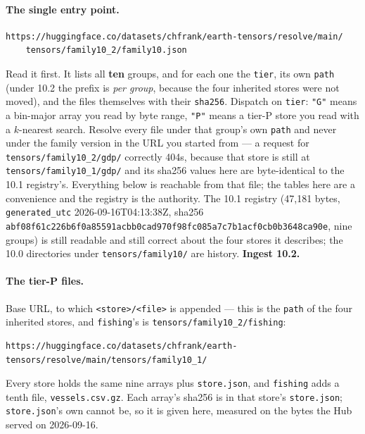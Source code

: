 \documentclass[10pt]{article}
\newcommand{\code}[1]{\texttt{#1}}
\begin{document}
\paragraph{The single entry point.}
\begin{verbatim}
https://huggingface.co/datasets/chfrank/earth-tensors/resolve/main/
    tensors/family10_2/family10.json
\end{verbatim}
Read it first. It lists all \textbf{ten} groups, and for each one the
\code{tier}, its own \code{path} (under 10.2 the prefix is \emph{per group},
because the four inherited stores were not moved), and the files themselves
with their \code{sha256}. Dispatch on \code{tier}: \code{"G"} means a bin-major
array you read by byte range, \code{"P"} means a tier-P store you read with a
$k$-nearest search. Resolve every file under that group's own \code{path} and
never under the family version in the URL you started from --- a request for
\code{tensors/family10\_2/gdp/} correctly 404s, because that store is still at
\code{tensors/family10\_1/gdp/} and its sha256 values here are byte-identical to
the 10.1 registry's. Everything below is reachable from that file; the tables
here are a convenience and the registry is the authority. The 10.1 registry
(47,181 bytes, \code{generated\_utc} 2026-09-16T04:13:38Z, sha256
\code{abf08f61c226b6f0a85591acbb0cad97}\allowbreak\code{0f98fc085a7c7b1acf0cb0b3648ca90e},
nine groups) is still readable and still correct about the four stores it
describes; the 10.0 directories under \code{tensors/family10/} are history.
\textbf{Ingest 10.2.}

\paragraph{The tier-P files.} Base URL, to which \code{<store>/<file>} is
appended --- this is the \code{path} of the four inherited stores, and
\code{fishing}'s is \code{tensors/family10\_2/fishing}:
\begin{verbatim}
https://huggingface.co/datasets/chfrank/earth-tensors/resolve/main/tensors/family10_1/
\end{verbatim}
Every store holds the same nine arrays plus \code{store.json}, and
\code{fishing} adds a tenth file, \code{vessels.csv.gz}. Each array's
sha256 is in that store's \code{store.json}; \code{store.json}'s own cannot be,
so it is given here, measured on the bytes the Hub served on 2026-09-16.
\end{document}
